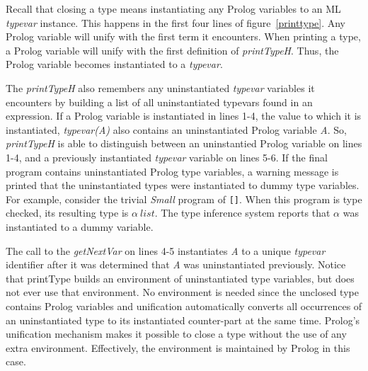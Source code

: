 \documentclass[10pt]{luthercs}
\begin{document}
Recall that closing a type means instantiating any Prolog variables to an ML {\em typevar} instance. This happens in the first four lines of figure~\ref{printtype}. Any Prolog variable will unify with the first term it encounters. When printing a type, a Prolog variable will unify with the first definition of {\em printTypeH}. Thus, the Prolog variable becomes instantiated to a {\em typevar}. 

The {\em printTypeH} also remembers any uninstantiated {\em typevar} variables it encounters by building a list of all uninstantiated typevars found in an expression. If a Prolog variable is instantiated in lines 1-4, the value to which it is instantiated, {\em typevar(A)} also contains an uninstantiated Prolog variable {\em A}. So, {\em printTypeH} is able to distinguish between an uninstantied Prolog variable on lines 1-4, and a previously instantiated {\em typevar} variable on lines 5-6. If the final program contains uninstantiated Prolog type variables, a warning message is printed that the uninstantiated types were instantiated to dummy type variables. For example, consider the trivial {\em Small} program of \verb+[]+. When this program is type checked, its resulting type is $\alpha~list$. The type inference system reports that $\alpha$ was instantiated to a dummy variable. 

The call to the {\em getNextVar} on lines 4-5 instantiates {\em A} to a unique {\em typevar} identifier after it was determined that {\em A} was uninstantiated previously. Notice that printType builds an environment of uninstantiated type variables, but does not ever use that environment. No environment is needed since the unclosed type contains Prolog variables and unification automatically converts all occurrences of an uninstantiated type to its instantiated counter-part at the same time. Prolog's unification mechanism makes it possible to close a type without the use of any extra environment. Effectively, the environment is maintained by Prolog in this case.
\end{document}
